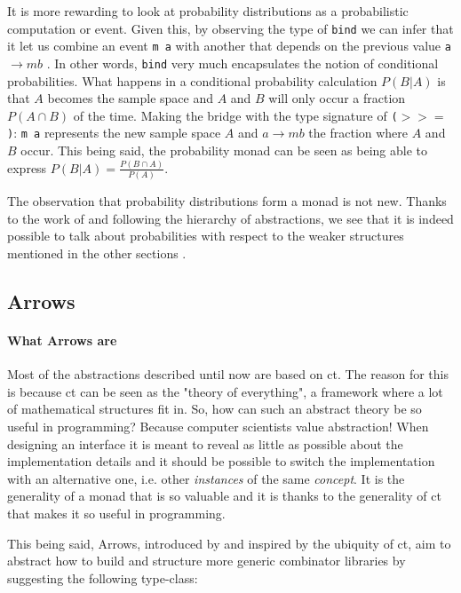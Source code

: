 \documentclass[
  oneside,
  11pt, a4paper,
  footinclude=true,
  headinclude=true,
  cleardoublepage=empty
]{scrbook}
\theoremstyle{definition}
\theoremstyle{definition}
\begin{document}
	It is more rewarding to look at probability distributions as a probabilistic computation or event. Given this, by observing the type of \texttt{bind} we can infer that it let us combine an event \texttt{m a} with another that depends on the previous value \texttt{a $\rightarrow m b$} \citep{erwig_kollmansberger_2006}. In other words, \texttt{bind} very much encapsulates the notion of conditional probabilities. What happens in a conditional probability calculation $P(B|A)$ is that $A$ becomes the sample space and $A$ and $B$ will only occur a fraction $P(A \cap B)$ of the time. Making the bridge with the type signature of \texttt{($>>=$)}: \texttt{m a} represents the new sample space $A$ and \texttt{$a \rightarrow m b$} the fraction where $A$ and $B$ occur. This being said, the probability monad can be seen as being able to express $P(B|A) = \frac{P(B \cap A)}{P(A)}$. 
	            
	The observation that probability distributions form a monad is not new. Thanks to the work of \cite{giry1982} and following the hierarchy of abstractions, we see that it is indeed possible to talk about probabilities with respect to the weaker structures mentioned in the other sections \citep{jtobin, Scibior19}.
	            
	    \subsection{Arrows}
	    
	        \paragraph{What Arrows are}
	        
    Most of the abstractions described until now are based on \gls{ct}. The reason for this is because \gls{ct} can be seen as the "theory of everything", a framework where a lot of mathematical structures fit in. So, how can such an abstract theory be so useful in programming? Because computer scientists value abstraction! When designing an interface it is meant to reveal as little as possible about the implementation details and it should be possible to switch the implementation with an alternative one, i.e. other \emph{instances} of the same \emph{concept}. It is the generality of a monad that is so valuable and it is thanks to the generality of \gls{ct} that makes it so useful in programming.
    	        
    This being said, Arrows, introduced by \cite{Hughes:2000:GMA:347238.347246} and inspired by the ubiquity of \gls{ct}, aim to abstract how to build and structure more generic combinator libraries by suggesting the following type-class:
    	        
\end{document}
